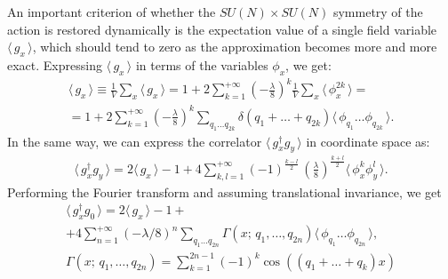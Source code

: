 \documentclass[12pt]{article}
\newcommand{\lr}[1]{ \left( #1 \right) }
\newcommand{\vev}[1]{ \langle \, #1 \, \rangle }
\begin{document}
 An important criterion of whether the $SU\lr{N} \times SU\lr{N}$ symmetry of the action is restored dynamically is the expectation value of a single field variable $\vev{g_x}$, which should tend to zero as the approximation becomes more and more exact. Expressing $\vev{g_x}$ in terms of the variables $\phi_x$, we get:
\begin{eqnarray}
\label{gx_vev_momentum}
 \vev{g_x} \equiv \frac{1}{V} \sum\limits_x \vev{g_x}
 =
 1 + 2 \sum\limits_{k=1}^{+\infty} \lr{-\frac{\lambda}{8}}^k \frac{1}{V} \sum\limits_x \vev{\phi_x^{2 k}}
 = \nonumber \\ =
 1 + 2 \sum\limits_{k=1}^{+\infty} \lr{-\frac{\lambda}{8}}^k
 \sum\limits_{q_1 \ldots q_{2 k}}
 \delta\lr{q_1 + \ldots + q_{2 k}}
 \vev{\phi_{q_1} \ldots \phi_{q_{2k}}} .
\end{eqnarray}
In the same way, we can express the correlator $\vev{g^{\dag}_x g_y}$ in coordinate space as:
\begin{eqnarray}
\label{gx_vev_space}
 \vev{g^{\dag}_x g_y}
 =
 2 \vev{g_x} - 1
 +
 4 \sum\limits_{k,l=1}^{+\infty}
 \lr{-1}^{\frac{k-l}{2}} \, \lr{\frac{\lambda}{8}}^{\frac{k+l}{2}}
 \vev{\phi_x^k \phi_y^l} .
\end{eqnarray}
Performing the Fourier transform and assuming translational invariance, we get
\begin{eqnarray}
\label{gx_vev_momentum}
 \vev{g^{\dag}_x g_0}
 =
 2 \vev{g_x} - 1
 + \nonumber \\ +
 4 \sum\limits_{n=1}^{+\infty} \lr{-\lambda/8}^n
 \sum\limits_{q_1 \ldots q_{2 n}}
 \Gamma\lr{x; \, q_1, \ldots, q_{2 n}}
 \vev{\phi_{q_1} \ldots \phi_{q_{2 n}}} ,
 \nonumber \\
 \Gamma\lr{x; \, q_1, \ldots, q_{2 n}} =
 \sum\limits_{k=1}^{2 n - 1} \lr{-1}^k \cos\lr{\lr{q_1 + \ldots + q_k} x}
\end{eqnarray}
\end{document}
